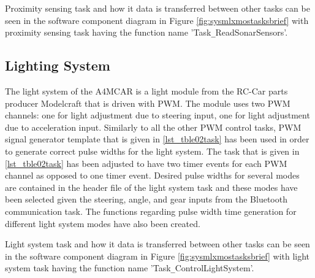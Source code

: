 Proximity sensing task and how it data is transferred between other tasks can be seen in the software component diagram in Figure \ref{fig:sysmlxmostasksbrief} with proximity sensing task having the function name 'Task\texttt{\_}ReadSonarSensors'.



\subsection{Lighting System}
The light system of the A4MCAR is a light module from the RC-Car parts producer Modelcraft that is driven with PWM. The module uses two PWM channels: one for light adjustment due to steering input, one for light adjustment due to acceleration input. Similarly to all the other PWM control tasks, PWM signal generator template that is given in \ref{lst_tble02task} has been used in order to generate correct pulse widths for the light system. The task that is given in \ref{lst_tble02task} has been adjusted to have two timer events for each PWM channel as opposed to one timer event. Desired pulse widths for several modes are contained in the header file of the light system task and these modes have been selected given the steering, angle, and gear inputs from the Bluetooth communication task. The functions regarding pulse width time generation for different light system modes have also been created. 

Light system task and how it data is transferred between other tasks can be seen in the software component diagram in Figure \ref{fig:sysmlxmostasksbrief} with light system task having the function name 'Task\texttt{\_}ControlLightSystem'.

